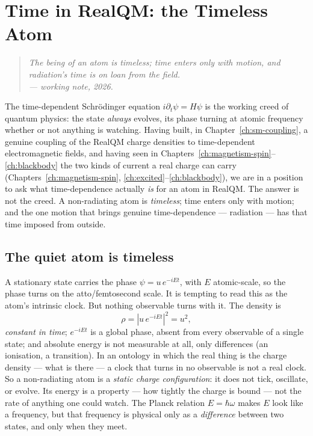 \chapter{Time in RealQM: the Timeless Atom}\label{ch:time}

\begin{quote}
\itshape The being of an atom is timeless; time enters only with motion, and radiation's time is on loan from the
field.\\
\normalfont\hfill --- working note, 2026.
\end{quote}
\bigskip

The time-dependent Schr\"odinger equation $i\partial_t\psi = H\psi$ is the working creed of quantum physics: the
state \emph{always} evolves, its phase turning at atomic frequency whether or not anything is watching. Having
built, in Chapter~\ref{ch:sm-coupling}, a genuine coupling of the RealQM charge densities to time-dependent
electromagnetic fields, and having seen in Chapters~\ref{ch:magnetism-spin}--\ref{ch:blackbody} the two kinds of
current a real charge can carry (Chapters~\ref{ch:magnetism-spin}, \ref{ch:excited}--\ref{ch:blackbody}), we are
in a position to ask what time-dependence actually \emph{is} for an atom in RealQM. The answer is not the creed. A non-radiating atom is \emph{timeless}; time enters only with motion;
and the one motion that brings genuine time-dependence --- radiation --- has that time imposed from outside.

\section{The quiet atom is timeless}\label{sec:quiet-atom}

A stationary state carries the phase $\psi = u\,e^{-iEt}$, with $E$ atomic-scale, so the phase turns on the
atto/femtosecond scale. It is tempting to read this as the atom's intrinsic clock. But nothing observable turns
with it. The density is
\[
\rho = |u\,e^{-iEt}|^2 = u^2 ,
\]
\emph{constant in time}; $e^{-iEt}$ is a global phase, absent from every observable of a single state; and
absolute energy is not measurable at all, only differences (an ionisation, a transition). In an ontology in which
the real thing is the charge density --- what is there --- a clock that turns in no observable is not a real
clock. So a non-radiating atom is a \emph{static charge configuration}: it does not tick, oscillate, or evolve.
Its energy is a property --- how tightly the charge is bound --- not the rate of anything one could watch. The
Planck relation $E = \hbar\omega$ makes $E$ look like a frequency, but that frequency is physical only as a
\emph{difference} between two states, and only when they meet.

